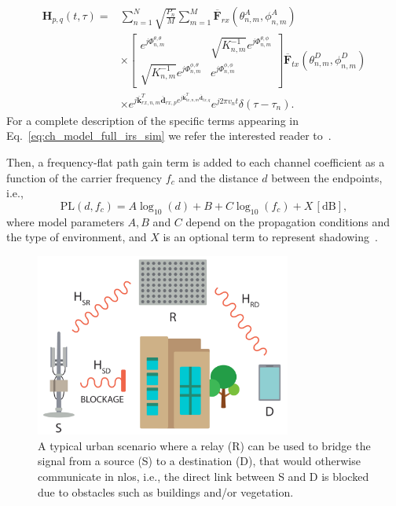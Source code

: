 \begin{equation}
\label{eq:ch_model_full_irs_sim}
\begin{aligned}
\bm{H}_{p, q}(t, \tau)=& \sum_{n=1}^{N} \sqrt{\frac{P_{n}}{M}} \sum_{m=1}^{M} \overline{\mathbf{F}}_{r x}\left(\theta_{n, m}^{A}, \phi_{n, m}^{A}\right) \\
& \times\left[\begin{array}{cr}
e^{j \Phi_{n, m}^{\theta, \theta}} & \sqrt{K_{n, m}^{-1}} e^{j \Phi_{n, m}^{\theta, \phi}} \\
\sqrt{K_{n, m}^{-1}} e^{j \Phi_{n, m}^{\phi, \theta}} & e^{j \Phi_{n, m}^{\phi, \phi}}
\end{array}\right] \overline{\mathbf{F}}_{tx}\left(\theta_{n, m}^{D}, \phi_{n, m}^{D}\right) \\
& \times e^{j \overline{\mathbf{k}}_{rx, n, m}^{T} \overline{\mathbf{d}}_{rx, p} e^{j \overline{\mathbf{k}}_{tx, n, m}^{T} \overline{\mathbf{d}}_{tx, q}}} e^{j 2 \pi v_{n} t} \delta\left(\tau-\tau_{n}\right).
\end{aligned}
\end{equation}
For a complete description of the specific terms appearing in Eq.~\eqref{eq:ch_model_full_irs_sim} we refer the interested reader to~\cite{zugno2020implementation}.

Then, a frequency-flat path gain term is added to each channel coefficient as a function of the carrier frequency $f_c$ and the distance $d$ between the endpoints, i.e., %
\begin{equation}
\text{PL} (d, f_c) = A \log_{10} (d) + B + C \log_{10} (f_c) + X \, [\mathrm{dB}],
\label{eq:pl}
\end{equation}
where model parameters $A, B$ and $C$ depend on the propagation conditions and the type of environment, and $X$ is an optional term to represent shadowing~\cite{zugno2020implementation}. 

\begin{figure}[t]
  \centering
    \includegraphics[width=0.75\textwidth]{Figures/IrsSimulation/Scenario_high_level.pdf}
  \caption{A typical urban scenario where a relay (R) can be used to bridge the signal from a source (S) to a destination (D), that would otherwise communicate in \acrshort{nlos}, i.e., the direct link between S and D is blocked due to obstacles such as buildings and/or vegetation.}
  \label{Fig:scenario_high_lvl}
\end{figure}

